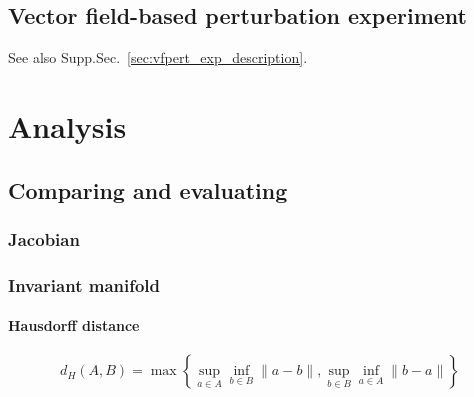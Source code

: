 \documentclass{article}
\theoremstyle{definition} \newtheorem{definition}{Definition}  \newtheorem{example}{Example}
\theoremstyle{remark} \newtheorem{remark}{Remark}
\newcounter{ct}
\begin{document}
\subsection{Vector field-based perturbation experiment}\label{sec:vfpert_exp_details}
See also Supp.Sec.~\ref{sec:vfpert_exp_description}.




\newpage
\section{Analysis}

\subsection{Comparing and evaluating}

\subsubsection{Jacobian}


\subsubsection{Invariant manifold}
\paragraph{Hausdorff distance}
\[
d_H(A, B) = \max\left\{ \sup_{a \in A} \inf_{b \in B} \|a - b\|, \sup_{b \in B} \inf_{a \in A} \|b - a\| \right\}
\]












\newpage
\end{document}
